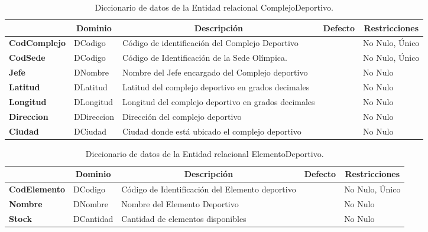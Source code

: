 \begin{table}[H]
\centering
\caption{Diccionario de datos de la Entidad relacional ComplejoDeportivo.}
\label{tab-DiccR-1d}
\begin{tabular}{>{\bfseries}m{4.0cm}>{}m{3.0cm}>{}m{6.0cm}>{}m{5.0cm}>{}m{2.0cm}}
\toprule
\multicolumn{1}{c}{\textbf{Atributo}} & \multicolumn{1}{c}{\textbf{Dominio}} & \multicolumn{1}{c}{\textbf{Descripción}} & \multicolumn{1}{c}{\textbf{Defecto}} & \multicolumn{1}{c}{\textbf{Restricciones}} \\ \midrule
CodComplejo	&	DCodigo	&	Código de identificación del Complejo Deportivo	&		&	No Nulo, Único\\
CodSede    & DCodigo   & Código de Identificación  de la Sede Olímpica. &   & No Nulo, Único\\
Jefe	&	DNombre	&	Nombre del Jefe encargado del Complejo deportivo	&		&	No Nulo\\
Latitud	&	DLatitud	&	Latitud del complejo deportivo en grados decimales	&		&	No Nulo\\
Longitud	&	DLongitud	&	Longitud del complejo deportivo en grados decimales	&		&	No Nulo\\
Direccion	&	DDireccion	&	Dirección del complejo deportivo	&		&	No Nulo\\
Ciudad	&	DCiudad	&	Ciudad donde está ubicado el complejo deportivo	&		&	No Nulo\\\bottomrule
\end{tabular}
\end{table}

\begin{table}[H]
\centering
\caption{Diccionario de datos de la Entidad relacional ElementoDeportivo.}
\label{tab-DiccR-1e}
\begin{tabular}{>{\bfseries}m{4.0cm}>{}m{3.0cm}>{}m{6.0cm}>{}m{5.0cm}>{}m{2.0cm}}
\toprule
\multicolumn{1}{c}{\textbf{Atributo}} & \multicolumn{1}{c}{\textbf{Dominio}} & \multicolumn{1}{c}{\textbf{Descripción}} & \multicolumn{1}{c}{\textbf{Defecto}} & \multicolumn{1}{c}{\textbf{Restricciones}} \\ \midrule
CodElemento	&	DCodigo	&	Código de Identificación del Elemento deportivo	&		&	No Nulo, Único\\
Nombre	&	DNombre	&	Nombre del Elemento Deportivo	&		&	No Nulo\\
Stock	&	DCantidad	&	Cantidad de elementos disponibles	&		&	No Nulo\\\bottomrule
\end{tabular}
\end{table}

